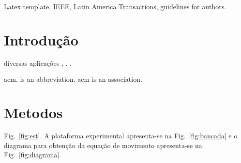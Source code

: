 \documentclass[journal, twoside]{IEEEtran}
\begin{document}







\maketitle

\begin{abstract}

\lipsum[2-3]
\end{abstract}

\begin{IEEEkeywords}
Latex template, IEEE, Latin America Transactions, guidelines for authors.
\end{IEEEkeywords}







\IEEEpeerreviewmaketitle



\section{Introdução}

 diversas aplicações \lipsum[1-4] \cite{bodaghi2017passive,ribeiro2015passive}, \cite{koroishi2015robust,koroishi2016robust}. \cite{min2017concept,mohammadi2015modeling},


 

\lipsum[1-5]
\ac{acm}, is an abbreviation. \Ac{acm} is an association.


\section{Metodos}
\lipsum[1-5]
 Fig.~\ref{fig:est}. A plataforma experimental apresenta-se na Fig.~\ref{fig:bancada} e o diagrama para obtenção da equação de movimento apresenta-se na Fig.~\ref{fig:diagrama}.
\end{document}
